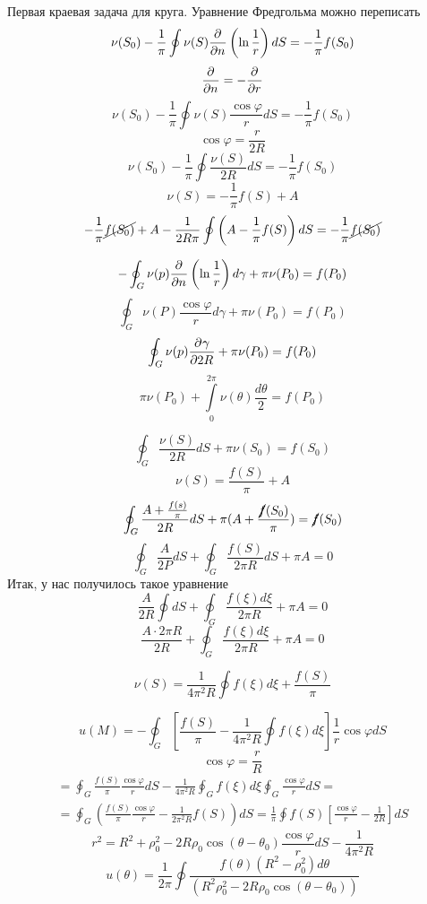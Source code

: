 \begin{example}{Первая краевая задача для круга.}
Уравнение Фредгольма можно переписать\\
\[
	\nu(S_0) - \frac{1}{\pi} \oint \nu (S) \frac{\partial^{}}{\partial n^{}} \left(\ln \frac{1}{r} \right) dS = - \frac{1}{\pi} f(S_0)
\]
\[
	\frac{\partial^{}}{\partial n^{}} = - \frac{\partial^{}}{\partial r^{}}
\]
\[
	\nu (S_0) - \frac{1}{\pi} \oint \nu(S) \frac{\cos \varphi}{r} dS = - \frac{1}{\pi} f(S_0)
\]
\[
	\cos \varphi = \frac{r}{2 R}
\]
\[
	\nu (S_0) - \frac{1}{\pi} \oint \frac{\nu(S)}{2 R} dS = - \frac{1}{\pi} f(S_0)
\]
\[
	\nu (S) = - \frac{1}{\pi} f (S) + A
\]
\[
	- \frac{1}{\pi} \cancel{f(S_0)} + A - \frac{1}{2 R \pi} \oint \left(A - \frac{1}{\pi} f(S) \right) dS = - \frac{1}{\pi} \cancel{f(S_0)}
\]

\[
	- \oint_G \nu(p) \frac{\partial^{}}{\partial n^{}} \left(\ln \frac{1}{r} \right) d \gamma + \pi \nu (P_0) = f (P_0)
\]
\[
	\oint_G \nu(P) \frac{\cos \varphi}{r} d \gamma + \pi \nu (P_0) = f (P_0)
\]
\[
	\oint_G \nu(p) \frac{\partial^{}\gamma}{\partial 2R^{}} + \pi \nu (P_0) = f(P_0)
\]
\[
	\pi \nu(P_0) + \int\limits_0^{2 \pi} \nu (\theta) \frac{d \theta}{2} = f (P_0)
\]

\[
	\oint_G \frac{\nu(S)}{2 R} dS + \pi \nu(S_0) = f(S_0)
\]
\[
	\nu(S) = \frac{f(S)}{\pi} + A
\]
\[
	\oint_G \frac{A + \frac{f(s)}{\pi}}{2R} dS +  \pi (A + \frac{\cancel f(S_0)}{\pi}) = \cancel f(S_0)
\]
\[
	\oint_G \frac{A}{2 P} dS + \oint_G \frac{f(S)}{2 \pi R} dS + \pi A = 0
\]
Итак, у нас получилось такое уравнение\\
\[
	\frac{A}{2R}\oint dS + \oint_G \frac{f(\xi) d\xi}{2 \pi R} + \pi A = 0
\]
\[
	\frac{A \cdot 2 \pi R}{2 R} + \oint_G \frac{f(\xi) d\xi}{2 \pi R} + \pi A = 0
\]

\[
	\nu(S) = \frac{1}{4 \pi^2 R} \oint f(\xi) d \xi + \frac{f(S)}{\pi}
\]


\[
	u(M) = - \oint_G \left[\frac{f(S)}{\pi} - \frac{1}{4 \pi^2 R} \oint f(\xi) d\xi \right] \frac{1}{r} \cos \varphi dS
\]
\[
	\cos \varphi = \frac{r}{R}
\]
\begin{multline*}
	 = \oint_G \frac{f(S)}{\pi} \frac{\cos \varphi}{r} dS - \frac{1}{4 \pi^2 R} \oint_G f(\xi) d \xi \oint_G \frac{\cos \varphi}{r} dS =\\ 
	 = \oint_G \left(\frac{f(S)}{\pi} \frac{\cos \varphi}{r} - \frac{1}{2 \pi^2 R} f(S) \right) dS = \frac{1}{\pi} \oint f(S) \left[\frac{\cos \varphi}{r} - \frac{1}{2 R} \right]dS
\end{multline*}
\[
	r^2 = R^2 + \rho_0^2 - 2 R \rho_0 \cos(\theta - \theta_0) \frac{\cos \varphi}{r} dS - \frac{1}{4 \pi^2 R}
\]
\[
	u(\theta) = \frac{1}{2 \pi } \oint \frac{f(\theta) (R^2 - \rho_0^2) d\theta}{(R^2 \rho_0^2 - 2 R \rho_0 \cos(\theta - \theta_0))}
\]
\end{example}

